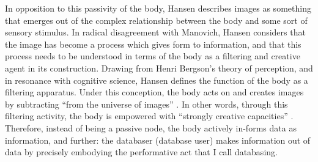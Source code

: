 In opposition to this passivity of the body, Hansen describes images as something that emerges out of the complex relationship between the body and some sort of sensory stimulus. In radical disagreement with Manovich, Hansen considers that the image has become a process which gives form to information, and that this process needs to be understood in terms of the body as a filtering and creative agent in its construction. Drawing from Henri Bergson's theory of perception, and in resonance with cognitive science, Hansen defines the function of the body as a filtering apparatus. Under this conception, the body acts on and creates images by subtracting ``from the universe of images'' \parencite[3]{Han04:New}. In other words, through this filtering activity, the body is empowered with ``strongly creative capacities'' \parencite[4]{Han04:New}. Therefore, instead of being a passive node, the body actively in-forms data as information, and further: the databaser (database user) makes information out of data by precisely embodying the performative act that I call databasing. 
